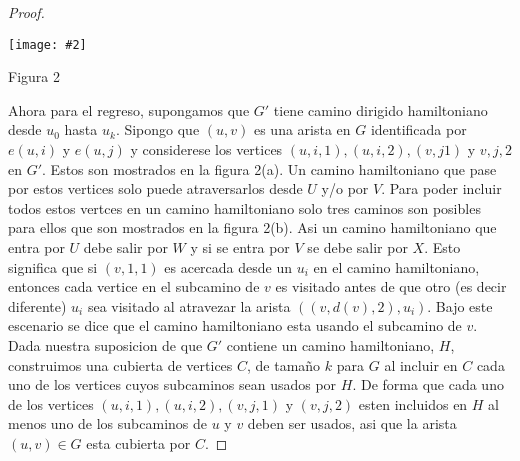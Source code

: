 \documentclass{article}
\newcommand{\jcimage}[2]{\begin{center}\texttt{[image: \#2]}\end{center}\vskip10pt}
\begin{document}
\begin{proof}
  \jcimage{0.7}{figura2-dhp.jpg}{Figura 2}

  Ahora para el regreso, supongamos que $G'$ tiene camino dirigido hamiltoniano desde $u_0$ hasta $u_k$. Sipongo que $(u,v)$ es una arista en $G$ identificada por $e(u,i)$ y $e(u,j)$ y considerese los vertices $(u,i,1),(u,i,2),(v,j1)$ y $v,j,2$ en $G'$. Estos son mostrados en la figura 2(a). Un camino hamiltoniano que pase por estos vertices solo puede atraversarlos desde $U$ y/o por $V$. Para poder incluir todos estos vertces en un camino hamiltoniano solo tres caminos son posibles para ellos que son mostrados en la figura 2(b). Asi un camino hamiltoniano que entra por $U$ debe salir por $W$ y si se entra por $V$ se debe salir por $X$. Esto significa que si $(v,1,1)$ es acercada desde un $u_i$ en el camino hamiltoniano, entonces cada vertice en el subcamino de $v$ es visitado antes de que otro (es decir diferente) $u_i$ sea visitado al atravezar la arista $((v,d(v),2), u_i)$. Bajo este escenario se dice que el camino hamiltoniano esta usando el subcamino de $v$. Dada nuestra suposicion de que $G'$ contiene un camino hamiltoniano, $H$, construimos una cubierta de vertices $C$, de tamaño $k$ para $G$ al incluir en $C$ cada uno de los vertices cuyos subcaminos sean usados por $H$. De forma que cada uno de los vertices $(u,i,1),(u,i,2),(v,j,1)$ y $(v,j,2)$ esten incluidos en $H$ al menos uno de los subcaminos de $u$ y $v$ deben ser usados, asi que la arista $(u,v) \in G$  esta cubierta por $C$.
\end{proof}
\end{document}
